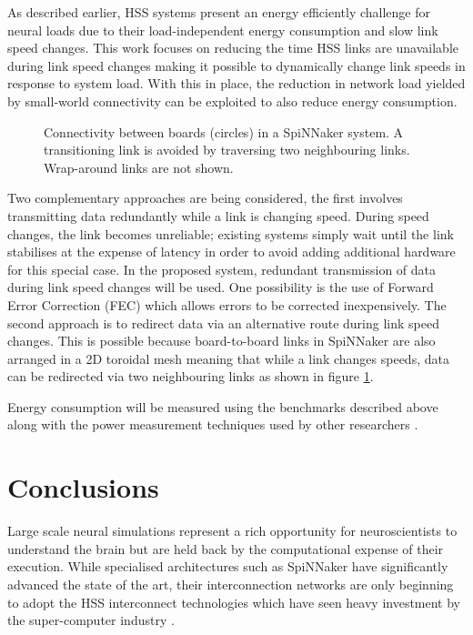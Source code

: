 		As described earlier, HSS systems present an energy efficiently challenge
		for neural loads due to their load-independent energy consumption and slow
		link speed changes. This work focuses on reducing the time HSS links are
		unavailable during link speed changes making it possible to dynamically
		change link speeds in response to system load. With this in place, the
		reduction in network load yielded by small-world connectivity can be
		exploited to also reduce energy consumption.
		
		\begin{figure}
			\center
			
			
			\caption{Connectivity between boards (circles) in a SpiNNaker system. A
			transitioning link is avoided by traversing two neighbouring links.
			Wrap-around links are not shown.}
			\label{fig:emergency-routing}
		\end{figure}
		
		Two complementary approaches are being considered, the first involves
		transmitting data redundantly while a link is changing speed. During speed
		changes, the link becomes unreliable; existing systems simply wait until the
		link stabilises at the expense of latency in order to avoid adding
		additional hardware for this special case. In the proposed system, redundant
		transmission of data during link speed changes will be used. One possibility
		is the use of Forward Error Correction (FEC) \cite{hamming50} which allows
		errors to be corrected inexpensively. The second approach is to redirect
		data via an alternative route during link speed changes. This is possible
		because board-to-board links in SpiNNaker are also arranged in a 2D toroidal
		mesh meaning that while a link changes speeds, data can be redirected via
		two neighbouring links as shown in figure \ref{fig:emergency-routing}.
		
		Energy consumption will be measured using the benchmarks described above
		along with the power measurement techniques used by other researchers
		\cite{sharp12,stromatias13}.


\section{Conclusions}
	
	Large scale neural simulations represent a rich opportunity for
	neuroscientists to understand the brain but are held back by the computational
	expense of their execution. While specialised architectures such as SpiNNaker
	have significantly advanced the state of the art, their interconnection
	networks are only beginning to adopt the HSS interconnect technologies which
	have seen heavy investment by the super-computer industry \cite{infinibandta}.
	
